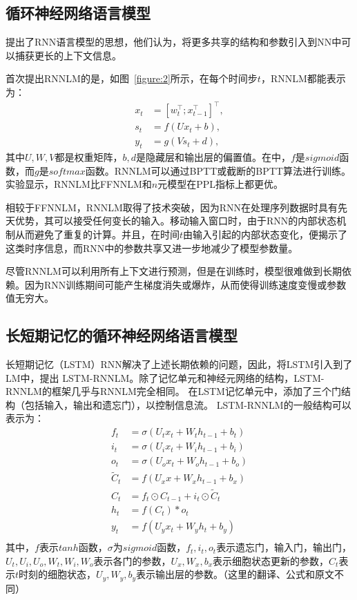 \documentclass[a4paper, 12pt, twocolumn]{article}
\newcommand{\figref}[1]{图~\ref{#1}}
\begin{document}
\subsection{循环神经网络语言模型}
\cite{bengio2003neural}提出了RNN语言模型的思想，他们认为，将更多共享的结构和参数引入到NN中可以捕获更长的上下文信息。

首次提出RNNLM的是\cite{mikolov2010recurrent,mikolov2011rnnlm}，如\figref{figure:2}所示，在每个时间步$t$，RNNLM都能表示为：
\begin{equation}
  \begin{aligned}
    x_t &= \left[w_t^\top ; x_{t-1}^\top \right]^\top , \\ 
    s_t &= f(Ux_t+b), \\ 
    y_t &= g(Vs_t + d),
  \end{aligned}
\end{equation}
其中$U,W,V$都是权重矩阵，$b, d$是隐藏层和输出层的偏置值。在\cite{mikolov2010recurrent,mikolov2011rnnlm}中，$f$是$sigmoid$函数，而$g$是$softmax$函数。RNNLM可以通过BPTT或截断的BPTT算法进行训练。实验显示，RNNLM比FFNNLM和$n$元模型在PPL指标上都更优。

相较于FFNNLM，RNNLM取得了技术突破，因为RNN在处理序列数据时具有先天优势，其可以接受任何变长的输入。移动输入窗口时，由于RNN的内部状态机制从而避免了重复的计算。并且，在时间$t$由输入引起的内部状态变化，便揭示了这类时序信息，而RNN中的参数共享又进一步地减少了模型参数量。

尽管RNNLM可以利用所有上下文进行预测，但是在训练时，模型很难做到长期依赖。因为RNN训练期间可能产生梯度消失或爆炸，从而使得训练速度变慢或参数值无穷大。

\subsection{长短期记忆的循环神经网络语言模型}
长短期记忆（LSTM）RNN解决了上述长期依赖的问题，因此，\cite{sundermeyer2012lstm}将LSTM引入到了LM中，提出 LSTM-RNNLM。除了记忆单元和神经元网络的结构，LSTM-RNNLM的框架几乎与RNNLM完全相同。 在LSTM记忆单元中，添加了三个门结构（包括输入，输出和遗忘门），以控制信息流。 LSTM-RNNLM的一般结构可以表示为：
\begin{equation}
  \begin{aligned}
    f_t &= \sigma(U_t x_t + W_t h_{t-1} + b_t)\\ 
    i_t &= \sigma(U_i x_t + W_i h_{t-1} + b_i)\\ 
    o_t &= \sigma(U_o x_t + W_o h_{t-1} + b_o)\\ 
    \widetilde{C}_t &= f\left(U_x x + W_x h_{t-1} + b_x\right) \\
    C_t &= f_t \odot C_{t-1} + i_t \odot \widetilde{C}_t \\
    h_t &= f(C_t) * o_t \\
    y_t &= f(U_y x_t + W_y h_t + b_y) \\
  \end{aligned}
\end{equation}
其中，$f$表示$tanh$函数，$\sigma$为$sigmoid$函数，$f_t, i_t, o_t$表示遗忘门，输入门，输出门，$U_t, U_i, U_o, W_t, W_i, W_o$表示各门的参数，$U_x, W_x, b_x$表示细胞状态更新的参数，$C_t$表示$t$时刻的细胞状态，$U_y, W_y, b_y$表示输出层的参数。（这里的翻译、公式和原文不同）
\end{document}
